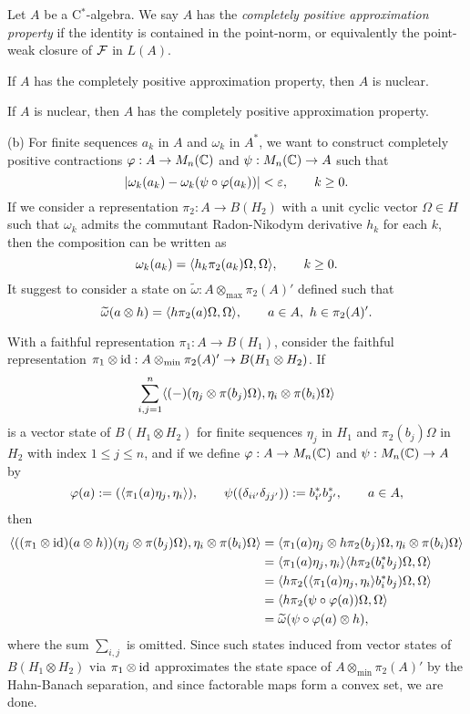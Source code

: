 \documentclass{../../large}
\begin{document}
\begin{prb}
Let $A$ be a C$^*$-algebra.
We say $A$ has the \emph{completely positive approximation property} if the identity is contained in the point-norm, or equivalently the point-weak closure of $\mathcal{F}$ in $L(A)$.
\begin{parts}
\item If $A$ has the completely positive approximation property, then $A$ is nuclear.
\item If $A$ is nuclear, then $A$ has the completely positive approximation property.
\end{parts}
\end{prb}
\begin{pf}

(b)
For finite sequences $a_k$ in $A$ and $\omega_k$ in $A^*$, we want to construct completely positive contractions $\varphi:A\to M_n(\mathbb{C})$ and $\psi:M_n(\mathbb{C})\to A$ such that
\[|\omega_k(a_k)-\omega_k(\psi\circ\varphi(a_k))|<\varepsilon,\qquad k\ge0.\]
If we consider a representation $\pi_2:A\to B(H_2)$ with a unit cyclic vector $\Omega\in H$ such that $\omega_k$ admits the commutant Radon-Nikodym derivative $h_k$ for each $k$, then the composition can be written as
\[\omega_k(a_k)=\langle h_k\pi_2(a_k)\Omega,\Omega\rangle,\qquad k\ge0.\]
It suggest to consider a state on $\tilde\omega:A\otimes_{\max}\pi_2(A)'$ defined such that
\[\tilde\omega(a\otimes h)=\<h\pi_2(a)\Omega,\Omega\>,\qquad a\in A,\ h\in\pi_2(A)'.\]

With a faithful representation $\pi_1:A\to B(H_1)$, consider the faithful representation $\pi_1\otimes\operatorname{id}:A\otimes_{\min}\pi_2(A)'\to B(H_1\otimes H_2)$.
If
\[\sum_{i,j=1}^n\langle(-)(\eta_j\otimes\pi(b_j)\Omega),\eta_i\otimes\pi(b_i)\Omega\rangle\]
is a vector state of $B(H_1\otimes H_2)$ for finite sequences $\eta_j$ in $H_1$ and $\pi_2(b_j)\Omega$ in $H_2$ with index $1\le j\le n$, and if we define $\varphi:A\to M_n(\mathbb{C})$ and $\psi:M_n(\mathbb{C})\to A$ by
\[\varphi(a):=(\langle\pi_1(a)\eta_j,\eta_i\rangle),\qquad\psi((\delta_{ii'}\delta_{jj'})):=b_{i'}^*b_{j'}^*,\qquad a\in A,\]
then
\begin{align*}
\langle((\pi_1\otimes\operatorname{id})(a\otimes h))(\eta_j\otimes\pi(b_j)\Omega),\eta_i\otimes\pi(b_i)\Omega\rangle
&=\langle\pi_1(a)\eta_j\otimes h\pi_2(b_j)\Omega,\eta_i\otimes\pi(b_i)\Omega\rangle\\
&=\langle\pi_1(a)\eta_j,\eta_i\rangle\langle h\pi_2(b_i^*b_j)\Omega,\Omega\rangle\\
&=\langle h\pi_2(\langle\pi_1(a)\eta_j,\eta_i\rangle b_i^*b_j)\Omega,\Omega\rangle\\
&=\langle h\pi_2(\psi\circ\varphi(a))\Omega,\Omega\rangle\\
&=\widetilde\omega(\psi\circ\varphi(a)\otimes h),
\end{align*}
where the sum $\sum_{i,j}$ is omitted.
Since such states induced from vector states of $B(H_1\otimes H_2)$ via $\pi_1\otimes\operatorname{id}$ approximates the state space of $A\otimes_{\min}\pi_2(A)'$ by the Hahn-Banach separation, and since factorable maps form a convex set, we are done.

\end{pf}
\end{document}
